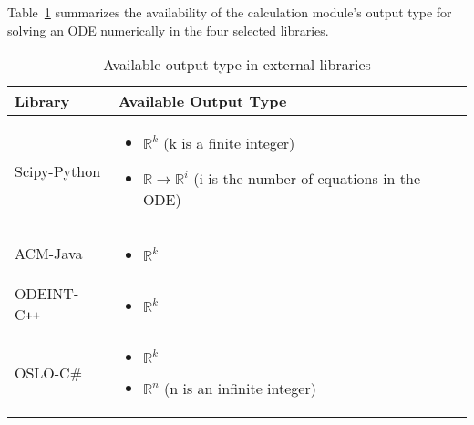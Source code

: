 Table~\ref{tab_outputtype} summarizes the availability of the calculation module's output type for solving an ODE numerically in the four selected libraries.
\begin{table}[ht]
\centering
\begin{tabular}{p{} | p{} } \hline
    \textbf{Library}&\textbf{Available Output Type}\\
    \toprule
    Scipy-Python & 
    \begin{itemize}[wide]
    \item $\mathbb{R}^k$ (k is a finite integer)
    \item $\mathbb{R} \rightarrow \mathbb{R}^i$ (i is the number of equations in the ODE)
    \end{itemize}  \\ \hline
    ACM-Java &     
    \begin{itemize}[wide]
    \item $\mathbb{R}^k$
    \end{itemize}  \\ \hline
    ODEINT-C\texttt{++} & 
    \begin{itemize}[wide]
    \item $\mathbb{R}^k$
    \end{itemize}\\ \hline
    OSLO-C\# & 
    \begin{itemize}[wide]
    \item $\mathbb{R}^k$
    \item $\mathbb{R}^n$ (n is an infinite integer)
    \end{itemize} \\
    \bottomrule	
\end{tabular}	
\caption{Available output type in external libraries}	
\label{tab_outputtype}
\end{table}

